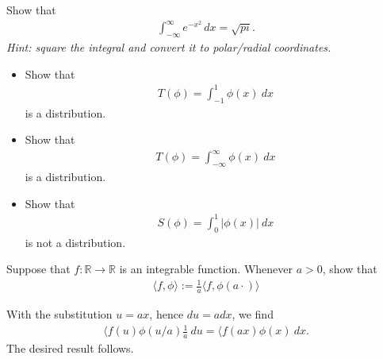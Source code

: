 \documentclass[11pt]{article}
\begin{document}


\begin{exercise}
 
Show that 
\begin{align}
    \int_{-\infty}^{\infty} e^{-x^2} \, dx = \sqrt{pi}. 
\end{align}
\textit{Hint: square the integral and convert it to polar/radial coordinates.}
\end{exercise}
\begin{solution}
\end{solution}


\begin{exercise}
    \begin{itemize}    
        \item 
        Show that 
        \begin{align}
            T(\phi) = \int_{-1}^{1} \phi(x) \ dx
        \end{align}
        is a distribution. 
        \item 
        Show that 
        \begin{align}
            T(\phi) = \int_{-\infty}^{\infty} \phi(x) \ dx
        \end{align}
        is a distribution. 
        \item 
        Show that 
        \begin{align}
            S(\phi) = \int_{0}^{1} |\phi(x)| \ dx 
        \end{align}
        is not a distribution.
    \end{itemize}
\end{exercise}
\begin{solution}
\end{solution}


\begin{exercise}
    Suppose that $f : \mathbb R \rightarrow \mathbb R$ is an integrable function. 
    Whenever $a > 0$, show that 
    \begin{align}
        \langle f, \phi \rangle := \frac{1}{a} \langle f, \phi(a \cdot) \rangle 
    \end{align}
\end{exercise}
\begin{solution}
    With the substitution $u = ax$, hence $du = a dx$, we find 
    \begin{align}
        \langle f(u) \phi(u/a) \frac 1 a \ d u
        = 
        \langle f(ax) \phi(x) \ d x 
        .
    \end{align}
    The desired result follows. 
\end{solution}
\end{document}
